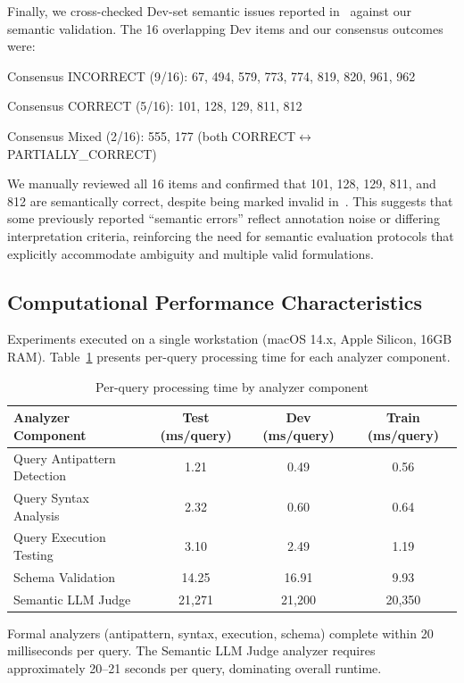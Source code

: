 \documentclass[]{einformatica}
\begin{document}
Finally, we cross-checked Dev-set semantic issues reported in~\cite{liu2025nl2sqlbugs} against our semantic validation. The 16 overlapping Dev items and our consensus outcomes were:

Consensus INCORRECT (9/16): 67, 494, 579, 773, 774, 819, 820, 961, 962

Consensus CORRECT (5/16): 101, 128, 129, 811, 812

Consensus Mixed (2/16): 555, 177 (both CORRECT$\leftrightarrow$PARTIALLY\_CORRECT)

We manually reviewed all 16 items and confirmed that 101, 128, 129, 811, and 812 are semantically correct, despite being marked invalid in~\cite{liu2025nl2sqlbugs}. This suggests that some previously reported ``semantic errors'' reflect annotation noise or differing interpretation criteria, reinforcing the need for semantic evaluation protocols that explicitly accommodate ambiguity and multiple valid formulations.

\subsection{Computational Performance Characteristics}\label{sec:performance}

Experiments executed on a single workstation (macOS 14.x, Apple Silicon, 16GB RAM). Table~\ref{tab:performance} presents per-query processing time for each analyzer component.

\begin{table}[ht]
    \caption{Per-query processing time by analyzer component}
    \label{tab:performance}
    \centering
    \footnotesize
    \begin{tabular}{lccc}
        \toprule
        \textbf{Analyzer Component} & \textbf{Test (ms/query)} & \textbf{Dev (ms/query)} & \textbf{Train (ms/query)} \\
        \midrule
        Query Antipattern Detection & 1.21 & 0.49 & 0.56 \\
        Query Syntax Analysis & 2.32 & 0.60 & 0.64 \\
        Query Execution Testing & 3.10 & 2.49 & 1.19 \\
        Schema Validation & 14.25 & 16.91 & 9.93 \\
        Semantic LLM Judge & 21,271 & 21,200 & 20,350 \\
        \bottomrule
    \end{tabular}
\end{table}

Formal analyzers (antipattern, syntax, execution, schema) complete within 20 milliseconds per query. The Semantic LLM Judge analyzer requires approximately 20--21 seconds per query, dominating overall runtime.
\end{document}
